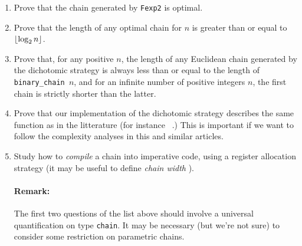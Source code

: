 \begin{project}

\vspace{3pt}

\noindent

\begin{enumerate}
\item  Prove that the chain generated by \texttt{Fexp2} is optimal.
\item Prove that  the length of any optimal chain for $n$ is
greater than or equal to $\lfloor\log_2{n}\rfloor$.
\item Prove that, for any positive $n$, the length of any Euclidean chain generated by the 
  dichotomic strategy  is always less than or equal to
  the length of \texttt{binary\_chain $n$}, and for an infinite number
of positive integers $n$, the first chain  is strictly shorter
than  the latter.
\item Prove that our implementation of the dichotomic strategy describes
 the same function as in the litterature (for instance ~\cite{DBLP:journals/ita/BrlekCHM95}.)
This is important if we want to follow the complexity analyses in this and similar articles.
\item Study how to \emph{compile} a chain into imperative code, using a register allocation strategy (it may be useful  to define \emph{chain width} ).

\paragraph*{Remark:} The first two questions of the list above should involve a 
universal quantification on type
\texttt{chain}. It may be necessary (but we're not sure) to consider  some 
restriction on parametric chains.

\end{enumerate}
\end{project}

